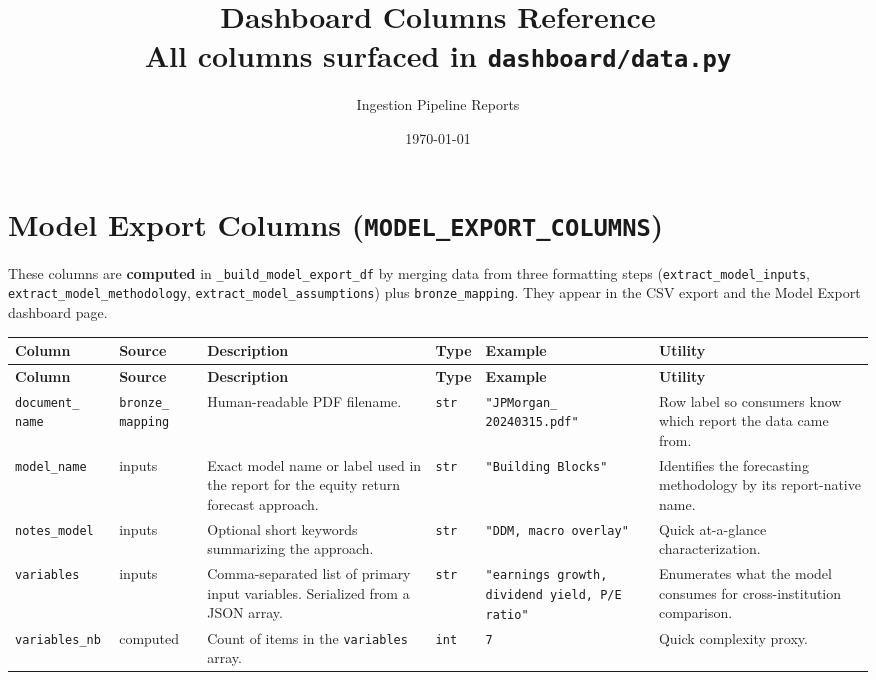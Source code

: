 \documentclass[11pt,a4paper]{article}
\title{\textbf{Dashboard Columns Reference}\\[0.3em]
\large All columns surfaced in \texttt{dashboard/data.py}}
\author{Ingestion Pipeline Reports}
\date{\today}
\begin{document}
\section{Model Export Columns (\texttt{MODEL\_EXPORT\_COLUMNS})}
\label{sec:model-export}

These columns are \textbf{computed} in \texttt{\_build\_model\_export\_df} by merging data from three formatting steps (\texttt{extract\_model\_inputs}, \texttt{extract\_model\_methodology}, \texttt{extract\_model\_assumptions}) plus \texttt{bronze\_mapping}. They appear in the CSV export and the Model Export dashboard page.

\begin{longtable}{@{} L{2.8cm} L{2.2cm} L{3.2cm} L{2.2cm} L{2.5cm} L{3cm} @{}}
\toprule
\textbf{Column} & \textbf{Source} & \textbf{Description} & \textbf{Type} & \textbf{Example} & \textbf{Utility} \\
\midrule
\endfirsthead
\toprule
\textbf{Column} & \textbf{Source} & \textbf{Description} & \textbf{Type} & \textbf{Example} & \textbf{Utility} \\
\midrule
\endhead
\bottomrule
\endfoot

\texttt{document\_ name}
  & \texttt{bronze\_ mapping}
  & Human-readable PDF filename.
  & \texttt{str}
  & \texttt{"JPMorgan\_ 20240315.pdf"}
  & Row label so consumers know which report the data came from. \\
\midrule

\texttt{model\_name}
  & inputs
  & Exact model name or label used in the report for the equity return forecast approach.
  & \texttt{str}
  & \texttt{"Building Blocks"}
  & Identifies the forecasting methodology by its report-native name. \\
\midrule

\texttt{notes\_model}
  & inputs
  & Optional short keywords summarizing the approach.
  & \texttt{str}
  & \texttt{"DDM, macro overlay"}
  & Quick at-a-glance characterization. \\
\midrule

\texttt{variables}
  & inputs
  & Comma-separated list of primary input variables. Serialized from a JSON array.
  & \texttt{str}
  & \texttt{"earnings growth, dividend yield, P/E ratio"}
  & Enumerates what the model consumes for cross-institution comparison. \\
\midrule

\texttt{variables\_nb}
  & computed
  & Count of items in the \texttt{variables} array.
  & \texttt{int}
  & \texttt{7}
  & Quick complexity proxy. \\
\midrule


\end{longtable}
\end{document}
